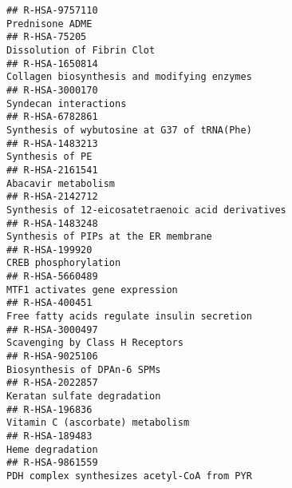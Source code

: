 \documentclass[
]{article}
\begin{document}
\begin{verbatim}
## R-HSA-9757110                                                                                                                      Prednisone ADME
## R-HSA-75205                                                                                                             Dissolution of Fibrin Clot
## R-HSA-1650814                                                                                          Collagen biosynthesis and modifying enzymes
## R-HSA-3000170                                                                                                                Syndecan interactions
## R-HSA-6782861                                                                                          Synthesis of wybutosine at G37 of tRNA(Phe)
## R-HSA-1483213                                                                                                                      Synthesis of PE
## R-HSA-2161541                                                                                                                  Abacavir metabolism
## R-HSA-2142712                                                                                    Synthesis of 12-eicosatetraenoic acid derivatives
## R-HSA-1483248                                                                                                 Synthesis of PIPs at the ER membrane
## R-HSA-199920                                                                                                                  CREB phosphorylation
## R-HSA-5660489                                                                                                       MTF1 activates gene expression
## R-HSA-400451                                                                                           Free fatty acids regulate insulin secretion
## R-HSA-3000497                                                                                                      Scavenging by Class H Receptors
## R-HSA-9025106                                                                                                          Biosynthesis of DPAn-6 SPMs
## R-HSA-2022857                                                                                                          Keratan sulfate degradation
## R-HSA-196836                                                                                                      Vitamin C (ascorbate) metabolism
## R-HSA-189483                                                                                                                      Heme degradation
## R-HSA-9861559                                                                                          PDH complex synthesizes acetyl-CoA from PYR

\end{verbatim}
\end{document}
